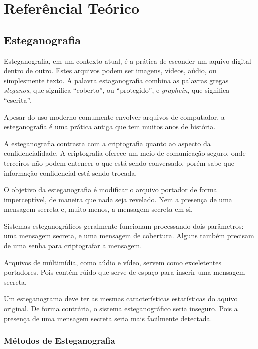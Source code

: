 \chapter{Referêncial Teórico}

\section{Esteganografia}

Esteganografia, em um contexto atual, é a prática de esconder um aquivo digital dentro de outro. Estes arquivos podem ser imagens, vídeos, aúdio, ou simplesmente texto. A palavra estaganografia combina as palavras gregas \emph{steganos}, que significa ``coberto'', ou ``protegido'', e \emph{graphein}, que significa ``escrita''.

Apesar do uso moderno comumente envolver arquivos de computador, a esteganografia é uma prática antiga que tem muitos anos de história.

A esteganografia contrasta com a criptografia quanto ao aspecto da confidencialidade. A criptografia oferece um meio de comunicação seguro, onde terceiros não podem enteneer o que está sendo conversado, porém sabe que informação confidencial está sendo trocada.

O objetivo da esteganografia é modificar o arquivo portador de forma imperceptível, de maneira que nada seja revelado. Nem a presença de uma mensagem secreta e, muito menos, a mensagem secreta em si. \cite{westfeld1999attacks}

Sistemas esteganográficos geralmente funcionam processando dois parâmetros: uma mensagem secreta, e uma mensagem de cobertura. \cite{westfeld1999attacks}  %
Alguns também precisam de uma senha para criptografar a mensagem. \cite{??}

Arquivos de múltimídia, como aúdio e vídeo, servem como exceletentes portadores. Pois contém rúido que serve de espaço para inserir uma mensagem secreta. \cite{westfeld1999attacks}

Um esteganograma deve ter as mesmas características estatísticas do aquivo original. De forma contrária, o sistema esteganográfico seria inseguro. \cite{westfeld1999attacks} Pois a presença de uma mensagem secreta seria mais facilmente detectada.



\subsection{Métodos de Esteganografia}

